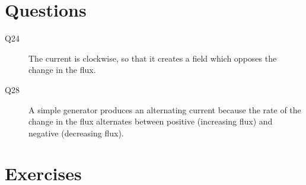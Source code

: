 \documentclass{exam}
\begin{document}
\ifprintanswers

\section{Questions}

\begin{description}

\item[Q24]
The current is clockwise, so that it creates a field which opposes the change in the flux.

\item[Q28]
A simple generator produces an alternating current because the rate of the change in the flux alternates between
positive (increasing flux) and negative (decreasing flux).

\end{description}

\section{Exercises}
\end{document}

